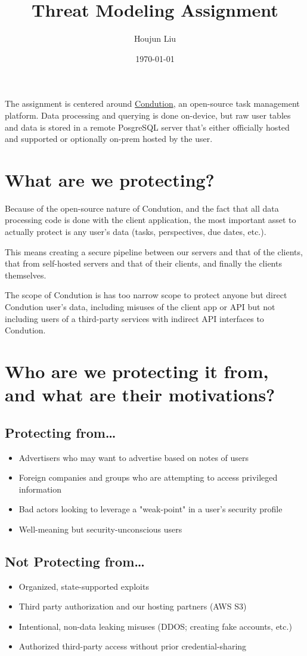 \documentclass[letterpaper]{article}
\author{Houjun Liu}
\date{\today}
\title{Threat Modeling Assignment}
\renewcommand{\tableofcontents}{}
\begin{document}
\tableofcontents

The assignment is centered around \href{https://www.condution.com/}{Condution}, an open-source task management platform. Data processing and querying is done on-device, but raw user tables and data is stored in a remote PosgreSQL server that's either officially hosted and supported or optionally on-prem hosted by the user.

\section{What are we protecting?}
\label{sec:orgd654587}
Because of the open-source nature of Condution, and the fact that all data processing code is done with the client application, the most important asset to actually protect is any user's data (tasks, perspectives, due dates, etc.).

This means creating a secure pipeline between our servers and that of the clients, that from self-hosted servers and that of their clients, and finally the clients themselves.

The scope of Condution is has too narrow scope to protect anyone but direct Condution user's data, including misuses of the client app or API but not including users of a third-party services with indirect API interfaces to Condution.

\section{Who are we protecting it from, and what are their motivations?}
\label{sec:orgba7bff2}

\subsection{Protecting from\ldots{}}
\label{sec:orgce846ca}
\begin{itemize}
\item Advertisers who may want to advertise based on notes of users
\item Foreign companies and groups who are attempting to access privileged information
\item Bad actors looking to leverage a "weak-point" in a user's security profile
\item Well-meaning but security-unconscious users
\end{itemize}

\subsection{Not Protecting from\ldots{}}
\label{sec:orga44f7e1}
\begin{itemize}
\item Organized, state-supported exploits
\item Third party authorization and our hosting partners (AWS S3)
\item Intentional, non-data leaking misuses (DDOS; creating fake accounts, etc.)
\item Authorized third-party access without prior credential-sharing
\end{itemize}
\end{document}
